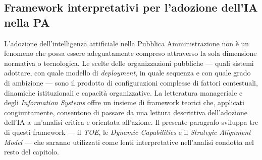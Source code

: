 %
%
%



\subsection{Framework interpretativi per l'adozione dell'IA nella PA}
\label{subsec:framework-interpretativi}

L'adozione dell'intelligenza artificiale nella Pubblica Amministrazione non è un fenomeno che possa essere adeguatamente compreso attraverso la sola dimensione normativa o tecnologica. Le scelte delle organizzazioni pubbliche — quali sistemi adottare, con quale modello di \textit{deployment}, in quale sequenza e con quale grado di ambizione — sono il prodotto di configurazioni complesse di fattori contestuali, dinamiche istituzionali e capacità organizzative. La letteratura manageriale e degli \textit{Information Systems} offre un insieme di framework teorici che, applicati congiuntamente, consentono di passare da una lettura descrittiva dell'adozione dell'IA a un'analisi critica e orientata all'azione. Il presente paragrafo sviluppa tre di questi framework — il \textit{TOE}, le \textit{Dynamic Capabilities} e il \textit{Strategic Alignment Model} — che saranno utilizzati come lenti interpretative nell'analisi condotta nel resto del capitolo.

